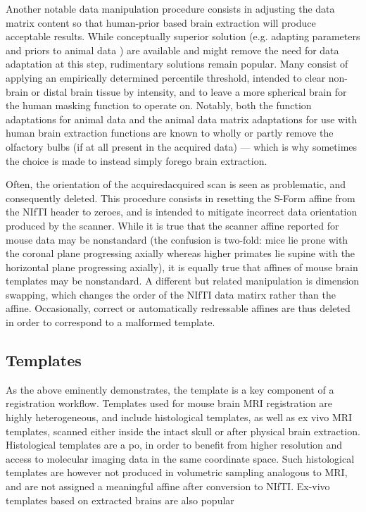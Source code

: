 Another notable data manipulation procedure consists in adjusting the data matrix content so that human-prior based brain extraction will produce acceptable results.
While conceptually superior solution (e.g. adapting parameters and priors to animal data \cite{rbet,Oguz2014}) are available and might remove the need for data adaptation at this step, rudimentary solutions remain popular.
Many consist of applying an empirically determined percentile threshold, intended to clear non-brain or distal brain tissue by intensity, and to leave a more spherical brain for the human masking function to operate on.
Notably, both the function adaptations for animal data and the animal data matrix adaptations for use with human brain extraction functions are known to wholly or partly remove the olfactory bulbs (if at all present in the acquired data) --- which is why sometimes the choice is made to instead simply forego brain extraction.

Often, the orientation of the acquiredacquired scan is seen as problematic, and consequently deleted.
This procedure consists in resetting the S-Form affine from the NIfTI header to zeroes, and is intended to mitigate incorrect data orientation produced by the scanner.
While it is true that the scanner affine reported for mouse data may be nonstandard (the confusion is two-fold: mice lie prone with the coronal plane progressing axially whereas higher primates lie supine with the horizontal plane progressing axially), it is equally true that affines of mouse brain templates may be nonstandard.
A different but related manipulation is dimension swapping, which changes the order of the NIfTI data matirx rather than the affine.
Occasionally, correct or automatically redressable affines are thus deleted in order to correspond to a malformed template.

\subsection{Templates}
As the above eminently demonstrates, the template is a key component of a registration workflow.
Templates used for mouse brain MRI registration are highly heterogeneous, and include histological templates, as well as ex vivo MRI templates, scanned either inside the intact skull or after physical brain extraction.
Histological templates are a po, in order to benefit from higher resolution and access to molecular imaging data in the same coordinate space.
Such histological templates are however not produced in volumetric sampling analogous to MRI, and are not assigned a meaningful affine after conversion to NIfTI.
Ex-vivo templates based on extracted brains are also popular

